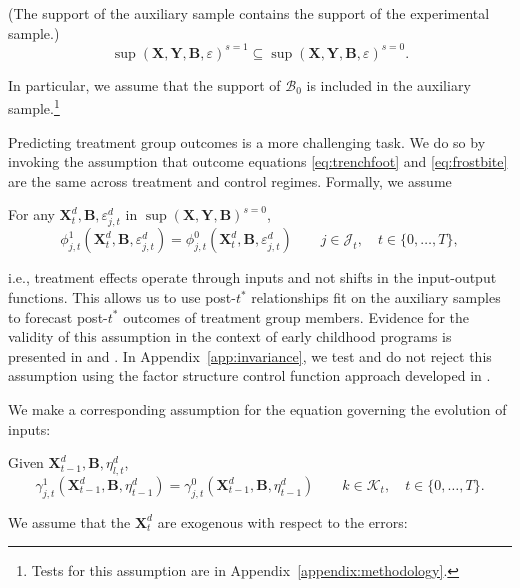 \begin{assumption} \label{ass:contain} (The support of the auxiliary sample contains the support of the experimental sample.)
\begin{equation*}
\sup(\bm{X}, \bm{Y}, \bm{B}, \varepsilon)^{s=1} \subseteq \sup (\bm{X}, \bm{Y}, \bm{B}, \varepsilon)^{s=0}.
\end{equation*}
\end{assumption}
In particular, we assume that the support of $\mathcal{B}_0$ is included in the auxiliary sample.\footnote{Tests for this assumption are in Appendix~\ref{appendix:methodology}.}

Predicting treatment group outcomes is a more challenging task. We do so by invoking the assumption that outcome equations \eqref{eq:trenchfoot} and \eqref{eq:frostbite} are the same across treatment and control regimes. Formally, we assume

\renewcommand\theassumption{A--\arabic{assumption}(a)}
\begin{assumption}\label{ass:eczema}
For any $\bm{X}^d_t, \bm{B}, \varepsilon^d_{j,t}$ in $\sup(\bm{X},\bm{Y},\bm{B})^{s=0}$,
\begin{equation*}
\phi^1_{j,t} (\bm{X}^d_t, \bm{B}, \varepsilon^d_{j,t}) = \phi^0_{j,t} (\bm{X}^d_t, \bm{B}, \varepsilon^d_{j,t}) \qquad j \in \mathcal J_t, \quad t \in \{0,\dots,T\},
\end{equation*}
\end{assumption}
i.e., treatment effects operate through inputs and not shifts in the input-output functions. This allows us to use post-$t^*$ relationships fit on the auxiliary samples to forecast post-$t^*$ outcomes of treatment group members. Evidence for the validity of this assumption in the context of early childhood programs is presented in \citet{Heckman_Pinto_etal_2013_PerryFactor} and \citet{Attanasio-etal_2015_NBER_Estimating-Production}. In Appendix~\ref{app:invariance}, we test and do not reject this assumption using the factor structure control function approach developed in \citet{Heckman_Pinto_etal_2013_PerryFactor}.

We make a corresponding assumption for the equation governing the evolution of inputs:
\addtocounter{assumption}{-1}
\renewcommand\theassumption{A--\arabic{assumption}(b)}
\begin{assumption}\label{ass:psoriasis}
Given $\bm{X}^d_{t-1}, \bm{B}, \eta^d_{l,t}$,
\begin{equation*}
\gamma^1_{j,t} (\bm{X}^d_{t-1}, \bm{B}, \eta^d_{t-1}) = \gamma^0_{j,t} (\bm{X}^d_{t-1}, \bm{B}, \eta^d_{t-1}) \qquad k \in \mathcal{K}_t, \quad t \in \{0,\dots,T\}.
\end{equation*}
\end{assumption}
We assume that the $\bm{X}^d_t$ are exogenous with respect to the errors:

